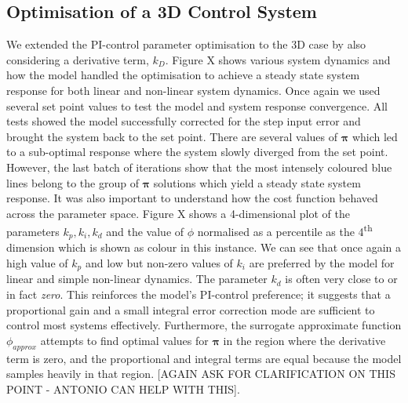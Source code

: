 \documentclass[conference]{IEEEtran}
\theoremstyle{definition}
\newcommand{\ts}{\textsuperscript}
\begin{document}
\subsection{Optimisation of a 3D Control System}
We extended the PI-control parameter optimisation to the 3D case by also considering a derivative term, $k_D$. Figure X shows various system dynamics and how the model handled the optimisation to achieve a steady state system response for both linear and non-linear system dynamics. Once again we used several set point values to test the model and system response convergence. All tests showed the model successfully corrected for the step input error and brought the system back to the set point. There are several values of $\boldsymbol \pi$ which led to a sub-optimal response where the system slowly diverged from the set point. However, the last batch of iterations show that the most intensely coloured blue lines belong to the group of $\boldsymbol \pi$ solutions which yield a steady state system response. It was also important to understand how the cost function behaved across the parameter space. Figure X shows a 4-dimensional plot of the parameters $k_p, k_i, k_d$ and the value of $\phi$ normalised as a percentile as the 4\ts{th} dimension which is shown as colour in this instance. We can see that once again a high value of $k_p$ and low but non-zero values of $k_i$ are preferred by the model for linear and simple non-linear dynamics. The parameter $k_d$ is often very close to or in fact \textit{zero}. This reinforces the model's PI-control preference; it suggests that a proportional gain and a small integral error correction mode are sufficient to control most systems effectively. Furthermore, the surrogate approximate function $\phi_{approx}$ attempts to find optimal values for $\boldsymbol \pi$ in the region where the derivative term is zero, and the proportional and integral terms are equal because the model samples heavily in that region. [AGAIN ASK FOR CLARIFICATION ON THIS POINT - ANTONIO CAN HELP WITH THIS]. 
\end{document}
